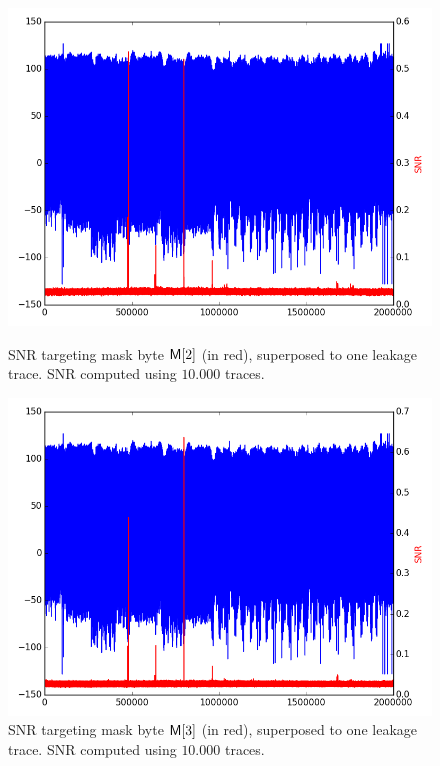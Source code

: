 \begin{figure}[H]
	\centering 
	\includegraphics[scale=0.35]{figures/2Mpts/SNR_M2_10ktraces.png}
	\caption{SNR targeting mask byte $\mathsf{M}[2]$ (in red), superposed to one leakage trace. SNR computed using $10.000$ traces.}
	\label{fig:SNR_M2}
	\includegraphics[scale=0.35]{figures/2Mpts/SNR_M3_10ktraces.png}
	\caption{SNR targeting mask byte $\mathsf{M}[3]$ (in red), superposed to one leakage trace. SNR computed using $10.000$ traces.}
	\label{fig:SNR_M3}
\end{figure}

